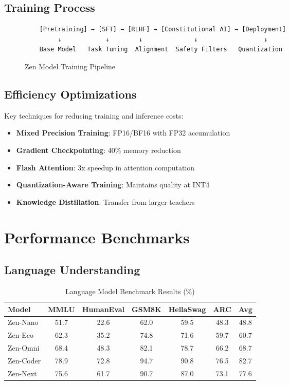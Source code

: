 \documentclass[11pt,a4paper]{article}
\begin{document}
\subsection{Training Process}

\begin{figure}[H]
\centering
\begin{verbatim}
    [Pretraining] → [SFT] → [RLHF] → [Constitutional AI] → [Deployment]
         ↓            ↓        ↓              ↓                  ↓
    Base Model   Task Tuning  Alignment  Safety Filters   Quantization
\end{verbatim}
\caption{Zen Model Training Pipeline}
\end{figure}

\subsection{Efficiency Optimizations}

Key techniques for reducing training and inference costs:
\begin{itemize}
    \item \textbf{Mixed Precision Training}: FP16/BF16 with FP32 accumulation
    \item \textbf{Gradient Checkpointing}: 40\% memory reduction
    \item \textbf{Flash Attention}: 3x speedup in attention computation
    \item \textbf{Quantization-Aware Training}: Maintains quality at INT4
    \item \textbf{Knowledge Distillation}: Transfer from larger teachers
\end{itemize}

\section{Performance Benchmarks}

\subsection{Language Understanding}

\begin{table}[H]
\centering
\begin{tabular}{lcccccc}
\toprule
\textbf{Model} & \textbf{MMLU} & \textbf{HumanEval} & \textbf{GSM8K} & \textbf{HellaSwag} & \textbf{ARC} & \textbf{Avg} \\
\midrule
Zen-Nano & 51.7 & 22.6 & 62.0 & 59.5 & 48.3 & 48.8 \\
Zen-Eco & 62.3 & 35.2 & 74.8 & 71.6 & 59.7 & 60.7 \\
Zen-Omni & 68.4 & 48.3 & 82.1 & 78.7 & 66.2 & 68.7 \\
Zen-Coder & 78.9 & 72.8 & 94.7 & 90.8 & 76.5 & 82.7 \\
Zen-Next & 75.6 & 61.7 & 90.7 & 87.0 & 73.1 & 77.6 \\
\bottomrule
\end{tabular}
\caption{Language Model Benchmark Results (\%)}
\end{table}
\end{document}
